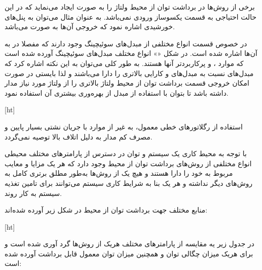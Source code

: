 برخی از روش‌ها در برداشت توان از محیط ولتاژ را به صورت  ایجاد می‌نماید که در این حالت احتیاجی به قسمت یکسوساز ورودی نمی‌باشد. به عنوان مثال می‌توان به پنل‌های خورشیدی اشاره نمود که خروجی آن‌ها به صورت  می‌باشد.


در خصوص قسمت  انواع مختلفی از مبدل‌های سوئیچینگ وجود دارند که مفصلا در  به آن‌ها اشاره شده است. در شکل «» انواع مختلف مبدل‌های سوئیچینگ آورده شده است که موارد ،  و  پرکاربردتر آنها هستند. به طور کلی می‌توان به این نکته اشاره کرد که مبدل‌های  نسبت به مبدل‌های  و  کارایی بالاتری را دارا می‌باشند و لذا بایستی در صورت امکان خروجی قسمت برداشت توان از محیط ولتاژ بالاتری را از ولتاژ مورد نیاز مدار داشته باشد تا بتوان با استفاده از مبدل  از بهره‌وری بیشتری آن استفاده نمود.


[ht]


استفاده از رگلاتورهای خطی معمول، به غیر از موارد با جریان نشتی بسیار پایین و مصرف کم مدار به دلیل اتلاف بالا توصیه نمی‌گردد.




با توجه به محیط کاری یک سیستم و توان در دسترس از پارامترهای مختلف محیطی انواع مختلفی از روش‌های برداشت توان از محیط وجود دارد که هر یک مزایا و معایب مربوط به خود را دارا هستند و هیچ یک از روش‌ها به‌طور مطلق برتری کامل به روش‌های دیگر نداشته و هر یک بنا به شرایط کاری سیستم می‌توانند برای تامین تغذیه سیستم به کار روند.

منابع مختلف جهت برداشت توان از محیط در شکل زیر آورده شده‌اند:

[ht]

در جدول زیر یه مقایسه از پارامتر‌های مختلف هریک از روش‌ها گرد آوری شده است و برای هریک میزان چگالی توان و همچنین میزان توان معمول قابل برداشت آورده شده است:


